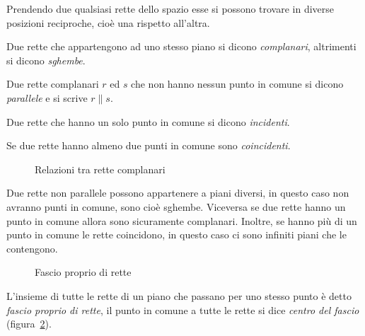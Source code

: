 Prendendo due qualsiasi rette dello spazio esse si possono trovare in 
diverse posizioni reciproche, cioè una rispetto all'altra.
\begin{definizione}
Due rette che appartengono ad uno stesso piano si dicono 
\emph{complanari}, altrimenti si dicono \emph{sghembe}.
\end{definizione}

\begin{definizione}
Due rette complanari $r$ ed $s$ che non hanno nessun punto in comune 
si dicono \emph{parallele} e si scrive $r\parallel s$.
\end{definizione}

\begin{definizione}
Due rette che hanno un solo punto in comune si dicono 
\emph{incidenti}.
\end{definizione}

\begin{definizione}
Se due rette hanno almeno due punti in comune sono \emph{coincidenti}.
\end{definizione}


\begin{inaccessibleblock}
 \begin{figure}[hbt]
 \centering 
 \caption{Relazioni tra rette complanari}\label{fig:1.12}
\end{figure}
\end{inaccessibleblock}

\osservazione Due rette non parallele possono appartenere a piani 
diversi, in questo caso non avranno punti in comune, sono cioè 
sghembe. Viceversa se due rette hanno un punto in comune allora sono 
sicuramente complanari. Inoltre, se hanno più di un punto in comune 
le rette coincidono, in questo caso ci sono infiniti piani che le 
contengono. 


\begin{inaccessibleblock}
 \begin{figure}[!htb]
  \centering
  \caption{Fascio proprio di rette}\label{fig:1.16}
\end{figure}
\end{inaccessibleblock}

\begin{definizione}
L'insieme di tutte le rette di un piano che passano per uno stesso 
punto è detto \emph{fascio proprio di rette}, il punto in comune a 
tutte le rette si dice \emph{centro del fascio} 
(figura~\ref{fig:1.16}).
\end{definizione}

